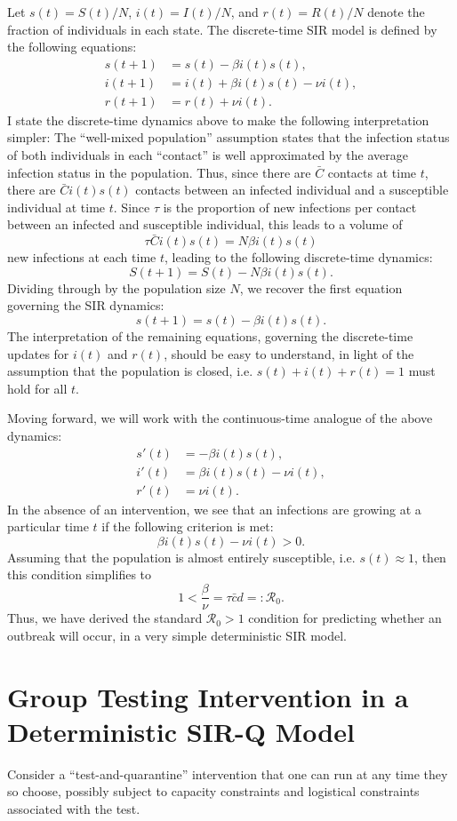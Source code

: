 \documentclass[11pt]{article}
\begin{document}
Let $s(t)=S(t)/N$, $i(t)=I(t)/N$, and $r(t)=R(t)/N$ denote the fraction of individuals in each
state.  The discrete-time SIR model is defined by the following equations:
\begin{align*}
    s(t+1) &= s(t) - \beta i(t) s(t),\\
    i(t+1) &= i(t) + \beta i(t) s(t) - \nu i(t),\\
    r(t+1) &= r(t) + \nu i(t).
\end{align*}
I state the discrete-time dynamics above to make the following interpretation simpler:
The ``well-mixed population'' assumption states that the infection status of both individuals
in each ``contact'' is well approximated by the average infection status in the population.  
Thus, since there are $\bar{C}$ contacts at time $t$, there are $\bar{C}i(t)s(t)$ 
contacts between an infected individual and a susceptible individual at time $t$.
Since $\tau$ is the proportion of new infections per contact between an infected and susceptible
individual, this leads to a volume of 
$$
\tau\bar{C}i(t)s(t) = N \beta i(t) s(t)
$$
new infections at each time $t$, leading to the following discrete-time dynamics:
$$
S(t+1) = S(t) - N\beta i(t)s(t).
$$
Dividing through by the population size $N$, we recover the first equation governing the SIR dynamics:
$$
s(t+1) = s(t) - \beta i(t) s(t).
$$
The interpretation of the remaining equations, governing the discrete-time updates for $i(t)$ and $r(t)$,
should be easy to understand, in light of the assumption that the population is closed, i.e.
$s(t)+i(t)+r(t)=1$ must hold for all $t$.

Moving forward, we will work with the continuous-time analogue of the above dynamics:
\begin{align}
s'(t) &= - \beta i(t) s(t),\\
i'(t) &= \beta i(t) s(t) - \nu i(t),\\
r'(t) &= \nu i(t).
\end{align}
In the absence of an intervention, we see that an infections are growing at a particular time $t$ if
the following criterion is met:
$$
\beta i(t) s(t) - \nu i(t) > 0.
$$
Assuming that the population is almost entirely susceptible, i.e. $s(t)\approx 1$, then this condition
simplifies to
$$
1 < \frac{\beta}{\nu} = \tau\bar{c}d =: \mathcal{R}_0.
$$
Thus, we have derived the standard $\mathcal{R}_0>1$ condition for predicting whether an outbreak
will occur, in a very simple deterministic SIR model. 

\section{Group Testing Intervention in a Deterministic SIR-Q Model}
Consider a ``test-and-quarantine'' intervention that one can run at any time they so choose, possibly subject
to capacity constraints and logistical constraints associated with the test.
\end{document}
